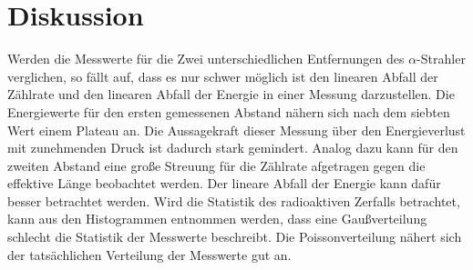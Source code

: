 \section{Diskussion}
\label{sec:Diskussion}
Werden die Messwerte für die Zwei unterschiedlichen Entfernungen des $\alpha$-Strahler verglichen, so fällt auf, dass es nur schwer möglich ist den linearen Abfall der Zählrate und den linearen Abfall der Energie in einer Messung darzustellen.
Die Energiewerte für den ersten gemessenen Abstand nähern sich nach dem siebten Wert einem Plateau an.
Die Aussagekraft dieser Messung über den Energieverlust mit zunehmenden Druck ist dadurch stark gemindert.
Analog dazu kann für den zweiten Abstand eine große Streuung für die Zählrate afgetragen gegen die effektive Länge beobachtet werden.
Der lineare Abfall der Energie kann dafür besser betrachtet werden.
Wird die Statistik des radioaktiven Zerfalls betrachtet, kann aus den Histogrammen entnommen werden, dass eine Gaußverteilung schlecht die Statistik der Messwerte beschreibt.
Die Poissonverteilung nähert sich der tatsächlichen Verteilung der Messwerte gut an.
